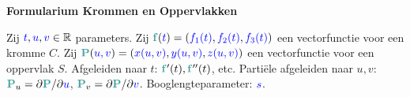 \documentclass[12pt]{article}
\renewcommand{\vec}[1]{\textcolor{vectorTeal}{\mathbf{#1}}}
\newcommand{\scalar}[1]{\textcolor{scalarBrightBlue}{#1}}
\begin{document}
\begin{center}
\Large \textbf{Formularium Krommen en Oppervlakken}
\end{center}

\vspace{1em} %

Zij $\scalar{t}, \scalar{u}, \scalar{v} \in \mathbb{R}$ parameters.
Zij $\vec{f}(\scalar{t}) = (\scalar{f_1(t)}, \scalar{f_2(t)}, \scalar{f_3(t)})$ een vectorfunctie voor een kromme $C$.
Zij $\vec{P}(\scalar{u, v}) = (\scalar{x(u,v)}, \scalar{y(u,v)}, \scalar{z(u,v)})$ een vectorfunctie voor een oppervlak $S$.
Afgeleiden naar $t$: $\vec{f}'(t), \vec{f}''(t)$, etc.
Partiële afgeleiden naar $u, v$: $\vec{P}_u = \partial\vec{P}/\partial\scalar{u}$, $\vec{P}_v = \partial\vec{P}/\partial\scalar{v}$.
Booglengteparameter: $\scalar{s}$.
\end{document}
